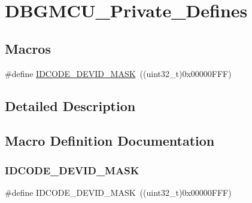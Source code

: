 \hypertarget{group___d_b_g_m_c_u___private___defines}{}\section{D\+B\+G\+M\+C\+U\+\_\+\+Private\+\_\+\+Defines}
\label{group___d_b_g_m_c_u___private___defines}
\subsection*{Macros}
\begin{DoxyCompactItemize}
\item 
\#define \mbox{\hyperlink{group___d_b_g_m_c_u___private___defines_gaeeece10cca80f3c632d3d77c3f2917b6}{I\+D\+C\+O\+D\+E\+\_\+\+D\+E\+V\+I\+D\+\_\+\+M\+A\+SK}}~((uint32\+\_\+t)0x00000\+F\+F\+F)
\end{DoxyCompactItemize}


\subsection{Detailed Description}


\subsection{Macro Definition Documentation}
\mbox{\label{group___d_b_g_m_c_u___private___defines_gaeeece10cca80f3c632d3d77c3f2917b6}} 
\subsubsection{\texorpdfstring{IDCODE\_DEVID\_MASK}{IDCODE\_DEVID\_MASK}}
{\footnotesize\ttfamily \#define I\+D\+C\+O\+D\+E\+\_\+\+D\+E\+V\+I\+D\+\_\+\+M\+A\+SK~((uint32\+\_\+t)0x00000\+F\+F\+F)}

